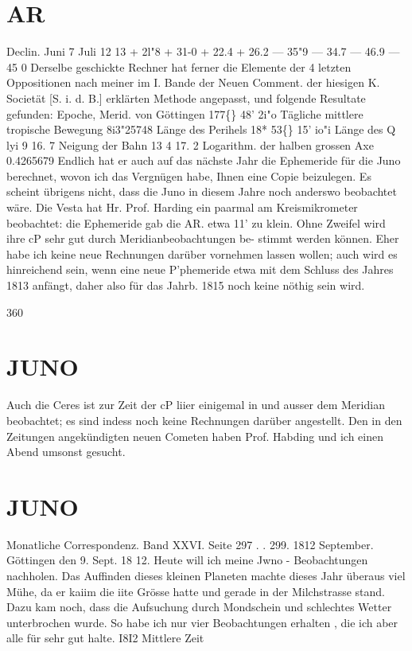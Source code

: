 \documentclass[12pt,a4paper]{article}
\newcommand{\degree}{\textdegree}
\begin{document}
\section*{AR}
Declin. 
Juni     7 
Juli    12 
13 
+  2l"8 
+  31-0 
+  22.4 
+  26.2 
---  35"9 
---  34.7 
---  46.9 
---  45  0 
Derselbe  geschickte  Rechner  hat  ferner  die  Elemente  der  4  letzten  Oppositionen  nach  meiner  im 
I.  Bande  der  Neuen  Comment.  der  hiesigen  K.  Societät  [S.  i.  d.  B.]  erklärten  Methode  angepasst,  und 
folgende  Resultate  gefunden: 
Epoche,  Merid.  von  Göttingen    177\degree\{\}  48'    2i"o 
Tägliche  mittlere  tropische  Bewegung    8i3"25748 
Länge  des  Perihels  18*   
53\degree\{\}  15'    io"i 
Länge  des   Q       
  lyi      9     16. 7 
Neigung  der  Bahn   
13      4     17.  2 
Logarithm.  der  halben  grossen  Axe    0.4265679 
Endlich  hat  er  auch  auf  das  nächste  Jahr  die  Ephemeride  für  die  Juno  berechnet,  wovon  ich  das 
Vergnügen  habe,  Ihnen  eine  Copie  beizulegen.  Es  scheint  übrigens  nicht,  dass  die  Juno  in  diesem 
Jahre  noch  anderswo  beobachtet  wäre. 
Die  Vesta  hat  Hr.  Prof.  Harding  ein  paarmal  am  Kreismikrometer  beobachtet:  die  Ephemeride 
gab  die  AR.  etwa  11'  zu  klein.  Ohne  Zweifel  wird  ihre  cP  sehr  gut  durch  Meridianbeobachtungen  be- 
stimmt werden  können.  Eher  habe  ich  keine  neue  Rechnungen  darüber  vornehmen  lassen  wollen;  auch 
wird  es  hinreichend  sein,  wenn  eine  neue  P'phemeride  etwa  mit  dem  Schluss  des  Jahres  1813  anfängt, 
daher  also  für  das  Jahrb.  1815  noch  keine  nöthig  sein  wird. 


\newpage
360 

\section*{JUNO}
Auch  die  Ceres  ist  zur  Zeit  der  cP  liier  einigemal  in  und  ausser  dem  Meridian  beobachtet;  es 
sind  indess  noch  keine  Rechnungen  darüber  angestellt. 
Den  in  den  Zeitungen  angekündigten  neuen  Cometen  haben  Prof.  Habding  und  ich  einen  Abend 
umsonst  gesucht. 

\section*{JUNO}
Monatliche  Correspondenz.    Band  XXVI.  Seite  297  . .  299.    1812  September. 
Göttingen  den  9.  Sept.  18 12. 
Heute  will  ich  meine  Jwno  -  Beobachtungen  nachholen.     Das  Auffinden  dieses   kleinen  Planeten 
machte  dieses  Jahr  überaus  viel  Mühe,  da  er  kaiim  die  iite  Grösse  hatte  und  gerade  in  der  Milchstrasse 
stand.     Dazu  kam  noch,   dass   die  Aufsuchung   durch  Mondschein   und    schlechtes  Wetter  unterbrochen 
wurde.    So  habe  ich  nur  vier  Beobachtungen  erhalten ,  die  ich  aber  alle  für  sehr  gut  halte. 
I8I2 
Mittlere  Zeit 
\end{document}
